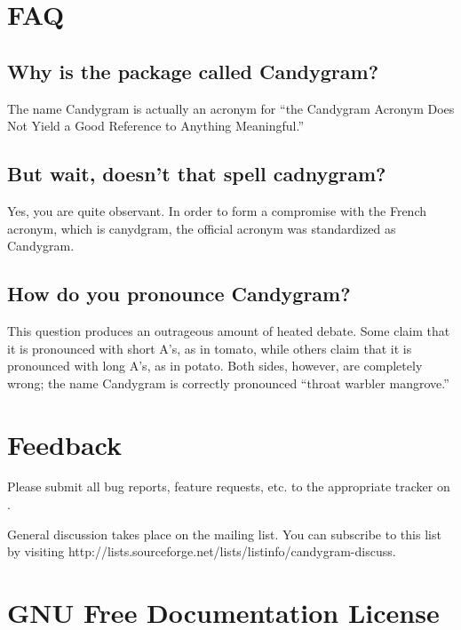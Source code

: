 \documentclass{howto}
\begin{document}
\section{FAQ}

\subsection{Why is the package called Candygram?}
The name Candygram is actually an acronym for ``the Candygram Acronym Does Not
Yield a Good Reference to Anything Meaningful.''

\subsection{But wait, doesn't that spell {\sc cadnygram}?}
Yes, you are quite observant. In order to form a compromise with the French
acronym, which is {\sc canydgram}, the official acronym was standardized as
{\sc Candygram}.

\subsection{How do you pronounce Candygram?}
This question produces an outrageous amount of heated debate. Some claim that
it is pronounced with short A's, as in tomato, while others claim that it is
pronounced with long A's, as in potato. Both sides, however, are completely
wrong; the name Candygram is correctly pronounced ``throat warbler mangrove.''



\section{Feedback}

Please submit all bug reports, feature requests, etc. to the appropriate tracker
on .

General discussion takes place on the
 mailing list. You can subscribe
to this list by visiting 
	{http://lists.sourceforge.net/lists/listinfo/candygram-discuss}.



\appendix
\section{GNU Free Documentation License}
\label{fdl}





\end{document}

